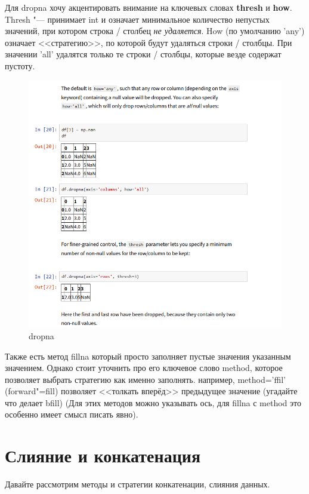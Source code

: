 \documentclass{article}
\begin{document}
Для dropna хочу акцентировать внимание на ключевых словах \textbf{thresh} и \textbf{how}. Thresh "--- принимает int и означает минимальное количество непустых значений, при котором строка / столбец \textit{не удаляется}. How (по умолчанию 'any') означает <<стратегию>>, по которой будут удаляться строки / столбцы. При значении 'all' удалятся только те строки / столбцы, которые везде содержат пустоту.
\begin{figure}[H]
    \centering
    \includegraphics[width=0.85\linewidth]{изображение.png}
    \caption{dropna}
    \label{fig:enter-label}
\end{figure}

Также есть метод fillna который просто заполняет пустые значения указанным значением. Однако стоит уточнить про его ключевое слово method, которое позволяет выбрать стратегию как именно заполнять. например, method='ffil' (forward"=fill) позволяет <<толкать вперёд>> предыдущее значение (угадайте что делает bfill) (Для этих методов можно указывать ось, для fillna с method это особенно имеет смысл писать явно).

\section*{Слияние и конкатенация}
Давайте рассмотрим методы и стратегии конкатенации, слияния данных.
\end{document}
